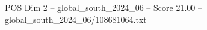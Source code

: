 \begin{textsample}{POS Dim 2 – global\_south\_2024\_06 – Score 21.00 – global\_south\_2024\_06/108681064.txt}
\end{textsample}
